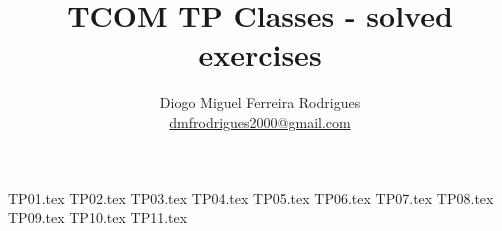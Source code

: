 \documentclass[a4paper]{article}
\title{TCOM TP Classes - solved exercises}
\author{Diogo Miguel Ferreira Rodrigues \\ \href{mailto:dmfrodrigues2000@gmail.com}{dmfrodrigues2000@gmail.com}}
\date{}
\begin{document}
\begingroup
	\maketitle
	\let\clearpage\relax
	\setcounter{tocdepth}{2}
	\tableofcontents
\endgroup
{TP01.tex}
{TP02.tex}
{TP03.tex}
{TP04.tex}
{TP05.tex}
{TP06.tex}
{TP07.tex}
{TP08.tex}
{TP09.tex}
{TP10.tex}
{TP11.tex}
\end{document}

